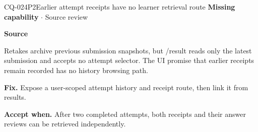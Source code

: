 \begin{finding}{CQ-024}{P2}{Earlier attempt receipts have no learner retrieval route}
\textbf{Missing capability} $\cdot$ Source review\par
\textbf{Source}\quad{}\par
Retakes archive previous submission snapshots, but /result reads only the latest submission and accepts no attempt selector. The UI promise that earlier receipts remain recorded has no history browsing path.\par
\textbf{Fix.} Expose a user-scoped attempt history and receipt route, then link it from results.\par
\textbf{Accept when.} After two completed attempts, both receipts and their answer reviews can be retrieved independently.
\end{finding}
\clearpage
